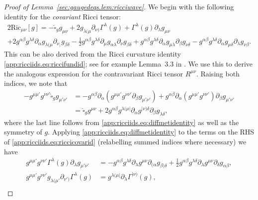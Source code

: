 \documentclass{article}
\newcommand{\Ric}{\mathrm{Ric}}
\newcommand{\wh}{\widehat}
\newcommand{\pa}{\partial}
\begin{document}
\begin{proof}[Proof of Lemma~\ref{sec:gaugedeqs.lem:ricciwave}]
    We begin with the following identity for the \emph{covariant} Ricci tensor:
    \begin{multline}\label{app:ricciids.eq:riccicovarid}
        2\Ric_{\mu\nu}[g] = -\wh{\square}_g g_{\mu\nu} +2g_{\lambda(\mu}\pa_{\nu)}\Gamma^\lambda(g) + \Gamma^{\lambda}(g)\pa_\lambda g_{\mu\nu}\\
        + 2g^{\alpha\beta}g^{\lambda\delta}\pa_\alpha g_{\lambda(\mu}\pa_{\nu_)}g_{\beta\delta} 
        - \frac{1}{2}g^{\alpha\beta}g^{\lambda\delta}\pa_{\mu}g_{\alpha\lambda}\pa_{\nu}g_{\beta\delta}
        + g^{\alpha\beta}g^{\lambda\delta}\pa_\alpha g_{\mu\lambda}\pa_\beta    g_{\nu\delta} - g^{\alpha\beta}g^{\lambda\delta}\pa_\alpha g_{\mu\delta}\pa_\lambda g_{\nu\beta}.
    \end{multline}
    This can be also derived from the Ricci curvature identity \eqref{app:ricciids.eq:riccifundid}; see for example Lemma~3.3 in \cite{HunLuk:Burnett:24}. We use this to derive the analogous expression for the contravariant Ricci tensor $R^{\mu\nu}$. Raising both indices, we note that
    \begin{align}
        -g^{\mu\mu'}g^{\nu\nu'}\wh{\square}_g g_{\mu'\nu'} &= -g^{\alpha\beta}\pa_\alpha (g^{\mu\mu'}g^{\nu\nu'}\pa_\beta g_{\mu'\nu'}) + g^{\alpha\beta} \pa_\alpha (g^{\mu\mu'}g^{\nu\nu'} )\pa_\beta g_{\mu'\nu'}\nonumber\\
        &= \wh{\square}_g g^{\mu\nu} + 2g^{\alpha\beta} g^{\lambda (\mu|}\pa_\alpha g^{|\nu)\delta} \pa_\beta g_{\lambda \delta}\label{app:ricciids.eq:ricciidentityraisedindices1},
    \end{align}
    where the last line follows from \eqref{app:ricciids.eq:diffmetidentity} as well as the symmetry of $g$. Applying \eqref{app:ricciids.eq:diffmetidentity} to the terms on the RHS of \eqref{app:ricciids.eq:riccicovarid} (relabelling summed indices where necessary) we have
    \begin{subequations}
        \begin{align}
            g^{\mu\mu'}g^{\nu\nu'} \Gamma^\lambda(g) \pa_\lambda g_{\mu'\nu'} &= -g^{\alpha\beta}g^{\lambda\delta}\pa_\lambda g^{\mu\nu}\pa_{(\alpha} g_{\beta)\delta} + \frac{1}{2}g^{\alpha\beta}g^{\lambda\delta}\pa_\lambda g^{\mu\nu}\pa_\delta g_{\alpha\beta},\\
            g^{\mu\mu'}g^{\nu\nu'}g_{\lambda(\mu'}\pa_{\nu')}\Gamma^\lambda(g) &= g^{\lambda (\mu|}\pa_\lambda \Gamma^{|\nu)}(g),\\

\end{align}
\end{subequations}
\end{proof}
\end{document}
